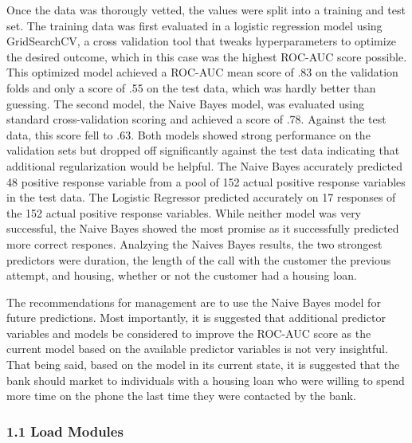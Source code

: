 \documentclass[11pt]{article}
\begin{document}
Once the data was thorougly vetted, the values were split into a
training and test set. The training data was first evaluated in a
logistic regression model using GridSearchCV, a cross validation tool
that tweaks hyperparameters to optimize the desired outcome, which in
this case was the highest ROC-AUC score possible. This optimized model
achieved a ROC-AUC mean score of .83 on the validation folds and only a
score of .55 on the test data, which was hardly better than guessing.
The second model, the Naive Bayes model, was evaluated using standard
cross-validation scoring and achieved a score of .78. Against the test
data, this score fell to .63. Both models showed strong performance on
the validation sets but dropped off significantly against the test data
indicating that additional regularization would be helpful. The Naive
Bayes accurately predicted 48 positive response variable from a pool of
152 actual positive response variables in the test data. The Logistic
Regressor predicted accurately on 17 responses of the 152 actual
positive response variables. While neither model was very successful,
the Naive Bayes showed the most promise as it successfully predicted
more correct respones. Analzying the Naives Bayes results, the two
strongest predictors were duration, the length of the call with the
customer the previous attempt, and housing, whether or not the customer
had a housing loan.

The recommendations for management are to use the Naive Bayes model for
future predictions. Most importantly, it is suggested that additional
predictor variables and models be considered to improve the ROC-AUC
score as the current model based on the available predictor variables is
not very insightful. That being said, based on the model in its current
state, it is suggested that the bank should market to individuals with a
housing loan who were willing to spend more time on the phone the last
time they were contacted by the bank.

    \hypertarget{load-modules}{%
\subsubsection{1.1 \textbar{} Load Modules}\label{load-modules}}
\end{document}

